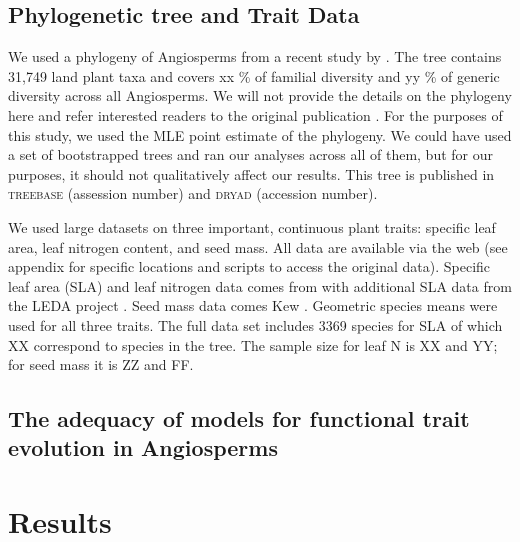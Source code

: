 \documentclass[a4paper,12pt]{article}
\begin{document}
\subsection*{Phylogenetic tree and Trait Data}
We used a phylogeny of Angiosperms from a recent study by \citet{Zanne2013}. The tree contains 31,749 land plant taxa and covers xx \% of familial diversity and yy \% of generic diversity across all Angiosperms. We will not provide the details on the phylogeny here and refer interested readers to the original publication \citep{Zanne2013}. For the purposes of this study, we used the MLE point estimate of the phylogeny. We could have used a set of bootstrapped trees and ran our analyses across all of them, but for our purposes, it should not qualitatively affect our results. This tree is published in \textsc{treebase} (assession number) and \textsc{dryad} (accession number).


We used large datasets on three important, continuous plant traits: specific leaf area, leaf nitrogen content, and seed mass.  All data are available via the web (see appendix for specific locations and scripts to access the original data). Specific leaf area (SLA) and leaf nitrogen data comes from \citet{Wright2004} with additional SLA data from the LEDA project \citep{Kleyer2008}.   Seed mass data comes Kew \citep{Kew2008}.  Geometric species means were used for all three traits.  The full data set includes 3369 species for SLA of which XX correspond to species in the \citet{Zanne2013} tree.  The sample size for leaf N is XX and YY; for seed mass it is ZZ and FF.  


\subsection*{The adequacy of models for functional trait evolution in Angiosperms}


\section*{Results}
\end{document}
